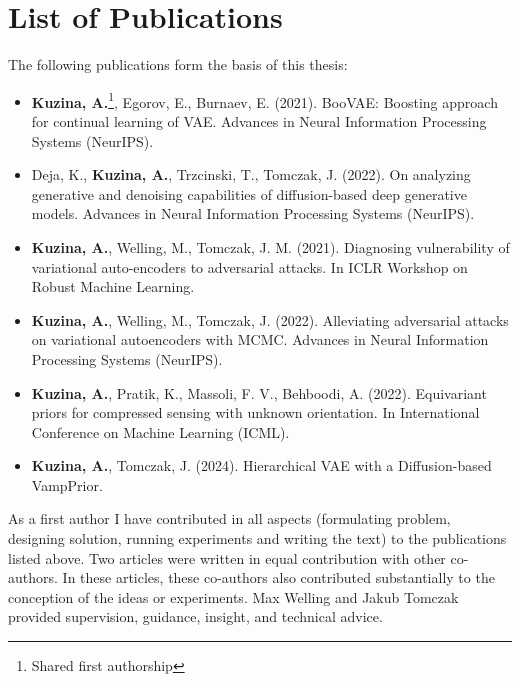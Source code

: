\chapter*{List of Publications}\label{chapter:papers}

The following publications form the basis of this thesis:
\begin{itemize}
    \item \textbf{Kuzina, A.}\footnote[1]{Shared first authorship}, Egorov, E.\footnotemark[1], Burnaev, E. (2021). BooVAE: Boosting approach for continual learning of VAE. Advances in Neural Information Processing Systems (NeurIPS).
    \item Deja, K\footnotemark[1]., \textbf{Kuzina, A.}\footnotemark[1], Trzcinski, T., Tomczak, J. (2022). On analyzing generative and denoising capabilities of diffusion-based deep generative models. Advances in Neural Information Processing Systems (NeurIPS).
    \item \textbf{Kuzina, A.}, Welling, M., Tomczak, J. M. (2021). Diagnosing vulnerability of variational auto-encoders to adversarial attacks. In ICLR Workshop on Robust Machine Learning.
    \item \textbf{Kuzina, A.}, Welling, M., Tomczak, J. (2022). Alleviating adversarial attacks on variational autoencoders with MCMC. Advances in Neural Information Processing Systems (NeurIPS).
    \item \textbf{Kuzina, A.}, Pratik, K., Massoli, F. V., Behboodi, A. (2022). Equivariant priors for compressed sensing with unknown orientation. In International Conference on Machine Learning (ICML).
    \item \textbf{Kuzina, A.},  Tomczak, J. (2024). Hierarchical VAE with a Diffusion-based VampPrior.
\end{itemize}

As a first author I have contributed in all aspects (formulating problem, designing solution, running experiments and writing the text) to the publications listed above.
Two articles were written in equal contribution with other co-authors.  
In these articles, these co-authors also contributed substantially to the conception of the ideas or experiments.
Max Welling and Jakub Tomczak provided supervision, guidance, insight, and technical advice.


